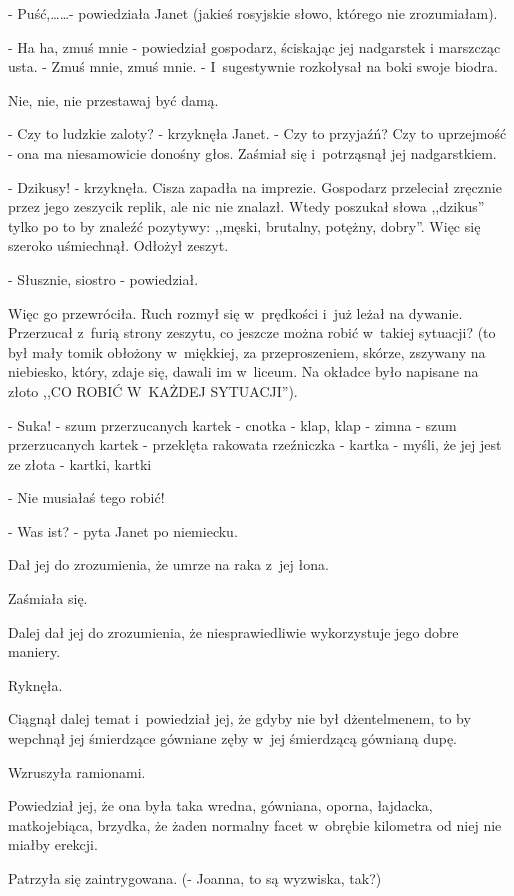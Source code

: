 \documentclass[oneside,polish,12pt,sfheadings]{mwbk}
\begin{document}
- Puść,\ldots\ldots - powiedziała Janet (jakieś rosyjskie słowo, którego
nie zrozumiałam).

- Ha ha, zmuś mnie - powiedział gospodarz, ściskając jej nadgarstek
i marszcząc usta. - Zmuś mnie, zmuś mnie. - I~sugestywnie rozkołysał
na boki swoje biodra.

Nie, nie, nie przestawaj być damą.

- Czy to ludzkie zaloty? - krzyknęła Janet. - Czy to przyjaźń? Czy
to uprzejmość - ona ma niesamowicie donośny głos. Zaśmiał się i~potrząsnął
jej nadgarstkiem.

- Dzikusy! - krzyknęła. Cisza zapadła na imprezie. Gospodarz przeleciał
zręcznie przez jego zeszycik replik, ale nic nie znalazł. Wtedy poszukał
słowa ,,dzikus'' tylko po to by znaleźć pozytywy: ,,męski, brutalny,
potężny, dobry''. Więc się szeroko uśmiechnął. Odłożył zeszyt.

- Słusznie, siostro - powiedział.

Więc go przewróciła. Ruch rozmył się w~prędkości i~już leżał na dywanie.
Przerzucał z~furią strony zeszytu, co jeszcze można robić w~takiej
sytuacji? (to był mały tomik obłożony w~miękkiej, za przeproszeniem,
skórze, zszywany na niebiesko, który, zdaje się, dawali im w~liceum.
Na okładce było napisane na złoto ,,CO ROBIĆ W~KAŻDEJ SYTUACJI'').

- Suka! - szum przerzucanych kartek - cnotka - klap, klap - zimna
- szum przerzucanych kartek - przeklęta rakowata rzeźniczka - kartka
- myśli, że jej jest ze złota - kartki, kartki

- Nie musiałaś tego robić!

- Was ist? - pyta Janet po niemiecku.

Dał jej do zrozumienia, że umrze na raka z~jej łona.

Zaśmiała się.

Dalej dał jej do zrozumienia, że niesprawiedliwie wykorzystuje jego
dobre maniery.

Ryknęła.

Ciągnął dalej temat i~powiedział jej, że gdyby nie był dżentelmenem,
to by wepchnął jej śmierdzące gówniane zęby w~jej śmierdzącą gównianą
dupę.

Wzruszyła ramionami.

Powiedział jej, że ona była taka wredna, gówniana, oporna, łajdacka,
matkojebiąca, brzydka, że żaden normalny facet w~obrębie kilometra
od niej nie miałby erekcji.

Patrzyła się zaintrygowana. (- Joanna, to są wyzwiska, tak?)
\end{document}
